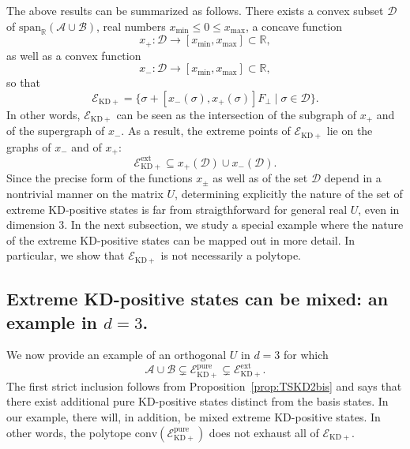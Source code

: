 \documentclass[a4paper, notitlepage, 11pt]{article}
\numberwithin{equation}{section}
\newcommand{\Acal}{{\mathcal A}}
\newcommand{\Bcal}{{\mathcal B}}
\newcommand{\Dcal}{{\mathcal D}}
\newcommand{\EcalKDC}{{\mathcal E}_{\mathrm{KD+}}}
\newcommand{\EcalKDCpu}{{\mathcal E}_{\mathrm{KD+}}^{\mathrm{pure}}}
\newcommand{\EcalKDCext}{{\mathcal E}_{\mathrm{KD+}}^{\mathrm{ext}}}
\newcommand{\spanRAB}{{\mathrm{span}_{\R}(\Acal\cup\Bcal)}}
\newcommand{\R}{\mathbb{R}}
\newcommand{\conv}[1]{\mathrm{conv}\left(#1\right)}
\begin{document}
The above results can be summarized as follows. 
There exists a convex subset $\mathcal D$ of $\spanRAB$, real numbers $x_{\min} \leq 0\leq  x_{\max}$, a concave function 
$$
x_{+}:\Dcal\to [x_{\min}, x_{\max}]\subset \R,
$$
as well as  a  convex function
$$
x_-:\mathcal D\to [x_{\min}, x_{\max}]\subset \R,
$$
so that 
$$
\EcalKDC=\{\sigma +[x_-(\sigma), x_+(\sigma)]F_\perp\mid \sigma\in\Dcal \}.
$$
In other words, $\EcalKDC$ can be seen as the intersection of the subgraph of $x_+$ and of the supergraph of $x_-$.
As a result, the extreme points of $\EcalKDC$ lie on the graphs of $x_-$ and of $x_+$:
$$
\EcalKDCext\subseteq x_+(\mathcal D)\cup x_-(\mathcal D).
$$
Since the precise form of the functions $x_{\pm}$ as well as of the set $\mathcal D$ depend in a nontrivial manner on the matrix $U$, determining explicitly the nature of the set of extreme KD-positive states is far from straigthforward for general real $U$, even in dimension $3$. In the next subsection, we study a special example where the nature of the extreme KD-positive states can be mapped out in more detail.  In particular, we show that $\EcalKDC$ is not necessarily a polytope. 


\subsection{Extreme KD-positive  states can be mixed: an example in $d=3$.}\label{s:mixedextremed=3}

We now provide an example of an orthogonal $U$ in $d=3$ for which
$$
\Acal\cup\Bcal\subsetneq \EcalKDCpu\subsetneq \EcalKDCext.
$$
The first strict inclusion follows from Proposition~\ref{prop:TSKD2bis} and says  that there exist additional pure KD-positive  states distinct from the basis states. In our example, there will, in addition, be mixed extreme KD-positive  states. In other words, the polytope $\conv{\EcalKDCpu}$ does not exhaust all of $\EcalKDC$. 
\end{document}
